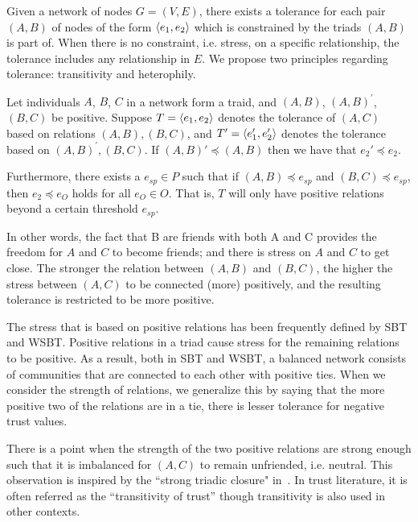 Given a network of nodes $G=(V,E)$, there exists a tolerance for each
pair $(A,B)$ of nodes of the form $\langle e_1,e_2\rangle$ which is
constrained by the triads $(A,B)$ is part of. When there is no
constraint, i.e. stress, on a specific relationship, the tolerance
includes any relationship in $E$. We propose two principles regarding
tolerance: transitivity and heterophily.

\begin{principle}
Let individuals $A$, $B$, $C$ in a network form a traid, and $(A,B)$,
$(A,B)^{'}$, $(B,C)$ be positive. Suppose $T=\langle e_1,e_2\rangle$ denotes
the tolerance of $(A,C)$ based on relations $(A,B),(B,C)$, and
$T'=\langle e_1',e_2'\rangle$ denotes the tolerance based on
$(A,B)^{'},(B,C)$. If $(A,B)' \preceq (A,B)$ then we have that
$e_2'\preceq e_2$.

Furthermore, there exists a $e_{sp} \in P$ such that if $(A,B)\preceq
e_{sp}$ and $(B,C) \preceq e_{sp}$, then $e_{2} \preceq e_{O}$ holds
for all $e_{O} \in O$. That is, $T$ will only have positive relations
beyond a certain threshold $e_{sp}$.
\end{principle}
In other words, the fact that B are friends with both A and C provides
the freedom for $A$ and $C$ to become friends; and there is stress on
$A$ and $C$ to get close. The stronger the relation between $(A,B)$
and $(B,C)$, the higher the stress between $(A,C)$ to be connected
(more) positively, and the resulting tolerance is restricted to be
more positive.

The stress that is based on positive relations has been frequently
defined by SBT and WSBT. Positive relations in a triad cause stress
for the remaining relations to be positive. As a result, both in SBT
and WSBT, a balanced network consists of communities that are
connected to each other with positive ties. When we consider the
strength of relations, we generalize this by saying that the more
positive two of the relations are in a tie, there is lesser tolerance
for negative trust values.

There is a point when the strength of the two positive relations are
strong enough such that it is imbalanced for $(A,C)$ to remain
unfriended, i.e. neutral. This observation is inspired by the ``strong
triadic closure" in~\cite{kleinberg-book}. In trust literature, it is
often referred as the ``transitivity of trust'' though transitivity is
also used in other contexts.

